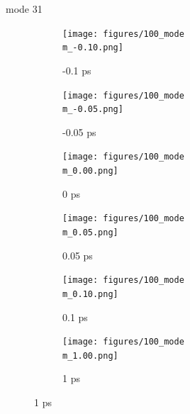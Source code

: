 \documentclass{beamer}
\newcommand\w{0.32}
\begin{document}
\renewcommand\m{31}
\begin{frame}{mode \m}
	\begin{figure}
		\centering
		\begin{subfigure}[b]{\w\textwidth}
			\centering
			\texttt{[image: figures/100\_mode\\m\_-0.10.png]}
			\caption{-0.1 ps}
		\end{subfigure}
		\begin{subfigure}[b]{\w\textwidth}
			\centering
			\texttt{[image: figures/100\_mode\\m\_-0.05.png]}
			\caption{-0.05 ps}
		\end{subfigure}
		\begin{subfigure}[b]{\w\textwidth}
			\centering
			\texttt{[image: figures/100\_mode\\m\_0.00.png]}
			\caption{0 ps}
		\end{subfigure}
		\begin{subfigure}[b]{\w\textwidth}
			\centering
			\texttt{[image: figures/100\_mode\\m\_0.05.png]}
			\caption{0.05 ps}
		\end{subfigure}
		\begin{subfigure}[b]{\w\textwidth}
			\centering
			\texttt{[image: figures/100\_mode\\m\_0.10.png]}
			\caption{0.1 ps}
		\end{subfigure}
		\begin{subfigure}[b]{\w\textwidth}
			\centering
			\texttt{[image: figures/100\_mode\\m\_1.00.png]}
			\caption{1 ps}
		\end{subfigure}
	\end{figure}
\end{frame}
\end{document}
